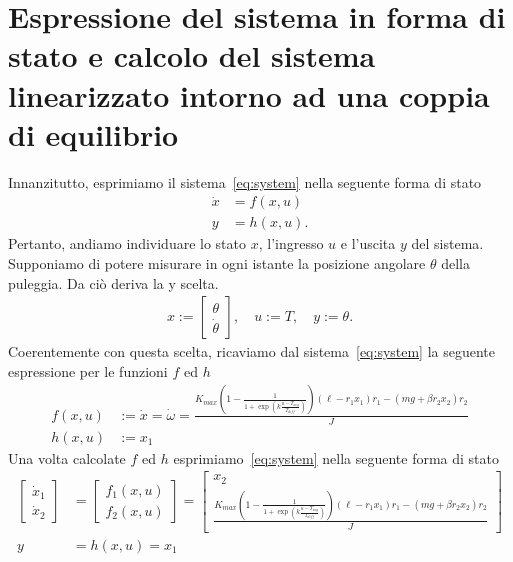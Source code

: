 \documentclass[a4paper, 11pt]{article}
\begin{document}
\section{Espressione del sistema in forma di stato e calcolo del sistema linearizzato intorno ad una coppia di equilibrio}

Innanzitutto, esprimiamo il sistema~\eqref{eq:system} nella seguente forma di stato
%
\begin{subequations}
\begin{align}\label{eq:state_form}
	\dot{x} &= f(x,u)
	\\
	y &= h(x,u).
\end{align}
\end{subequations}
%
Pertanto, andiamo individuare lo stato $x$, l'ingresso $u$ e l'uscita $y$ del sistema. 
%
Supponiamo di potere misurare in ogni istante la posizione angolare $\theta$ della puleggia. Da ciò deriva la y scelta.
%
\begin{align*}
	x := \begin{bmatrix}\theta  \\ \dot{\theta}\end{bmatrix}, \quad u := T , \quad y := \theta.
\end{align*}
%
Coerentemente con questa scelta, ricaviamo dal sistema~\eqref{eq:system} la seguente espressione per le funzioni $f$ ed $h$
%
\begin{align*}
	f(x,u) &:= \dot{x} = \dot{\omega}= 
	\frac{K_{max}\left(1-\frac{1}{1+\exp\left(k\frac{u-T_{avg}}{T_{diff}}\right)}\right) (\ell-r_1x_1)r_1 - (mg + \beta  r_2  x_2) r_2}{J}
	\\
	h(x,u) &:= x_1
\end{align*}
%
Una volta calcolate $f$ ed $h$ esprimiamo~\eqref{eq:system} nella seguente forma di stato
%
\begin{subequations}\label{eq:our_system_state_form}
\begin{align}
	\begin{bmatrix}
		\dot{x}_1
		\\
		\dot{x}_2
	\end{bmatrix} &= 
        \begin{bmatrix}
            f_1(x,u) 
            \\
            f_2(x,u)
        \end{bmatrix} =
        \begin{bmatrix}
            x_2 
            \\
            \frac{K_{max}\left(1-\frac{1}{1+\exp\left(k\frac{u-T_{avg}}{T_{diff}}\right)}\right) (\ell-r_1x_1)r_1 - (mg + \beta  r_2  x_2) r_2}{J}
        \end{bmatrix} \label{eq:state_form_1}
	\\
	y &= h(x,u) = x_1
\end{align}
\end{subequations}
\end{document}
